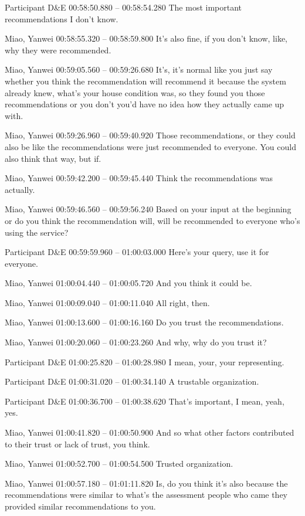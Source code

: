 {Participant D\&E 00:58:50.880 -- 00:58:54.280
The most important recommendations I don't know.

Miao, Yanwei 00:58:55.320 -- 00:58:59.800
It's also fine, if you don't know, like, why they were recommended.

Miao, Yanwei 00:59:05.560 -- 00:59:26.680
It's, it's normal like you just say whether you think the recommendation will recommend it because the system already knew, what's your house condition was, so they found you those recommendations or you don't you'd have no idea how they actually came up with.

Miao, Yanwei 00:59:26.960 -- 00:59:40.920
Those recommendations, or they could also be like the recommendations were just recommended to everyone. You could also think that way, but if.

Miao, Yanwei 00:59:42.200 -- 00:59:45.440
Think the recommendations was actually.

Miao, Yanwei 00:59:46.560 -- 00:59:56.240
Based on your input at the beginning or do you think the recommendation will, will be recommended to everyone who's using the service?

Participant D\&E 00:59:59.960 -- 01:00:03.000
Here's your query, use it for everyone.

Miao, Yanwei 01:00:04.440 -- 01:00:05.720
And you think it could be.

Miao, Yanwei 01:00:09.040 -- 01:00:11.040
All right, then.

Miao, Yanwei 01:00:13.600 -- 01:00:16.160
Do you trust the recommendations.

Miao, Yanwei 01:00:20.060 -- 01:00:23.260
And why, why do you trust it?

Participant D\&E 01:00:25.820 -- 01:00:28.980
I mean, your, your representing.

Participant D\&E 01:00:31.020 -- 01:00:34.140
A trustable organization.

Participant D\&E 01:00:36.700 -- 01:00:38.620
That's important, I mean, yeah, yes.

Miao, Yanwei 01:00:41.820 -- 01:00:50.900
And so what other factors contributed to their trust or lack of trust, you think.

Miao, Yanwei 01:00:52.700 -- 01:00:54.500
Trusted organization.

Miao, Yanwei 01:00:57.180 -- 01:01:11.820
Is, do you think it's also because the recommendations were similar to what's the assessment people who came they provided similar recommendations to you.

}
